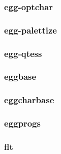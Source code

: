 \documentclass[a4paper]{article}
\begin{document}
\clearpage\subsubsection[egg{}-optchar]{egg-optchar}
\hypertarget{RefHeading22771167907073}{}\subsubsection{}
\clearpage\subsubsection[egg{}-palettize]{egg-palettize}
\hypertarget{RefHeading22791167907073}{}\subsubsection{}
\clearpage\subsubsection[egg{}-qtess]{egg-qtess}
\hypertarget{RefHeading22811167907073}{}\subsubsection{}
\clearpage\subsubsection[eggbase]{eggbase}
\hypertarget{RefHeading22831167907073}{}\subsubsection{}
\clearpage\subsubsection[eggcharbase]{eggcharbase}
\hypertarget{RefHeading22851167907073}{}\subsubsection{}
\clearpage\subsubsection[eggprogs]{eggprogs}
\hypertarget{RefHeading22871167907073}{}\subsubsection{}
\clearpage\subsubsection[flt]{flt}
\end{document}
